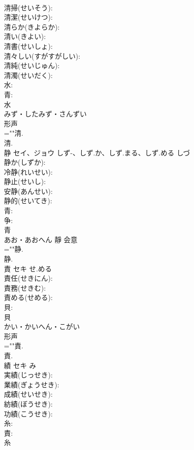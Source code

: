 \documentclass[8pt]{extreport}
\begin{document}
\begin{CJK}{UTF8}{min}
\\	清掃(せいそう): 
\\	清潔(せいけつ): 
\\	清らか(きよらか): 
\\	清い(きよい): 
\\	清書(せいしょ): 
\\	清々しい(すがすがしい): 
\\	清純(せいじゅん): 
\\	清濁(せいだく): 
\\	水: 
\\	青: 
\\	水	
\\	みず・したみず・さんずい	
\\	形声 
\\	=""清.
\\	清.
\\	静	セイ、ジョウ	しず-、しず.か、しず.まる、しず.める	しづ	
\\	静か(しずか): 
\\	冷静(れいせい): 
\\	静止(せいし): 
\\	安静(あんせい): 
\\	静的(せいてき): 
\\	青: 
\\	争: 
\\	青	
\\	あお・あおへん	靜	会意 
\\	=""静.
\\	静.
\\	責	セキ	せ.める		
\\	責任(せきにん): 
\\	責務(せきむ): 
\\	責める(せめる): 
\\	貝: 
\\	貝	
\\	かい・かいへん・こがい	
\\	形声 
\\	=""責.
\\	責.
\\	績	セキ		み	
\\	実績(じっせき): 
\\	業績(ぎょうせき): 
\\	成績(せいせき): 
\\	紡績(ぼうせき): 
\\	功績(こうせき): 
\\	糸: 
\\	責: 
\\	糸	

\end{CJK}
\end{document}
